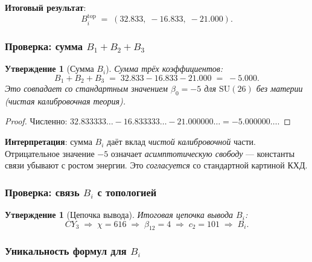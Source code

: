 \documentclass[11pt,a4paper]{article}
\newcommand{\SU}{\ensuremath{\mathrm{SU}}}
\newcommand{\CY}{\ensuremath{CY_3}}
\newtheorem{proposition}[theorem]{Утверждение}
\theoremstyle{definition}
\begin{document}
\medskip\noindent
\textbf{Итоговый результат}:
\begin{equation}
    \boxed{
    B_i^{\text{top}} \;=\; (32.833,\; -16.833,\; -21.000).
    }
    \label{eq:bi-topology-values}
\end{equation}

\subsubsection{Проверка: сумма \texorpdfstring{$B_1 + B_2 + B_3$}{B\_1 + B\_2 + B\_3}}

\begin{proposition}[Сумма $B_i$]
\label{prop:bi-sum}
Сумма трёх коэффициентов:
\begin{equation}
    B_1 + B_2 + B_3 \;=\; 32.833 - 16.833 - 21.000 \;=\; -5.000.
    \label{eq:bi-sum}
\end{equation}
Это совпадает со стандартным значением $\beta_0 = -5$ для
$\SU(26)$ \emph{без материи} (чистая калибровочная теория).
\end{proposition}

\begin{proof}
Численно:
$32.833333\ldots - 16.833333\ldots - 21.000000\ldots = -5.000000\ldots$.
\end{proof}

\medskip\noindent
\textbf{Интерпретация}: сумма $B_i$ даёт вклад \emph{чистой
калибровочной} части. Отрицательное значение
$-5$ означает \emph{асимптотическую свободу}
--- константы связи убывают с ростом энергии. Это \emph{согласуется}
со стандартной картиной КХД.

\subsubsection{Проверка: связь \texorpdfstring{$B_i$}{B\_i} с топологией}

\begin{proposition}[Цепочка вывода]
\label{prop:bi-chain}
Итоговая цепочка вывода $B_i$:
\begin{equation}
    \boxed{
    \CY \;\Rightarrow\; \chi = 616
    \;\Rightarrow\; \beta_{12} = 4
    \;\Rightarrow\; c_2 = 101
    \;\Rightarrow\; B_i.
    }
    \label{eq:bi-chain}
\end{equation}
\end{proposition}

\subsubsection{Уникальность формул для \texorpdfstring{$B_i$}{B\_i}}
\end{document}
